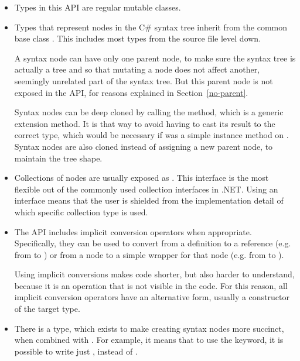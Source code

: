 \begin{itemize}
	
\item Types in this \ac{API} are regular mutable classes.

\item Types that represent nodes in the C\# syntax tree inherit from the common base class . This includes most types from the source file level down.

A syntax node can have only one parent node, to make sure the syntax tree is actually a tree and so that mutating a node does not affect another, seemingly unrelated part of the syntax tree. But this parent node is not exposed in the \ac{API}, for reasons explained in Section~\ref{no-parent}.

Syntax nodes can be deep cloned by calling the  method, which is a generic extension method. It is that way to avoid having to cast its result to the correct type, which would be necessary if  was a simple instance method on . Syntax nodes are also cloned instead of assigning a new parent node, to maintain the tree shape.

\item Collections of nodes are usually exposed as . This interface is the most flexible out of the commonly used collection interfaces in .NET. Using an interface means that the user is shielded from the implementation detail of which specific collection type is used.

\item The \ac{API} includes implicit conversion operators when appropriate. Specifically, they can be used to convert from a definition to a reference (e.g. from  to  \linebreak[0] ) or from a node to a simple wrapper for that node (e.g. from  to ).

Using implicit conversions makes code shorter, but also harder to understand, because it is an operation that is not visible in the code. For this reason, all implicit conversion operators have an alternative form, usually a constructor of the target type.

\item There is a  type, which exists to make creating syntax nodes more succinct, when combined with . For example, it means that to use the  keyword, it is possible to write just , instead of  .

\end{itemize}

